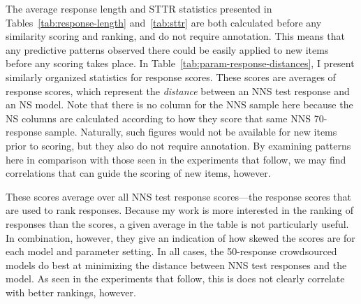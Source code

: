 The average response length and STTR statistics presented in Tables~\ref{tab:response-length} and~\ref{tab:sttr} are both calculated before any similarity scoring and ranking, and do not require annotation. This means that any predictive patterns observed there could be easily applied to new items before any scoring takes place. In Table~\ref{tab:param-response-distances}, I present similarly organized statistics for response scores. These scores are averages of response scores, which represent the \textit{distance} between an NNS test response and an NS model. Note that there is no column for the NNS sample here because the NS columns are calculated according to how they score that same NNS 70-response sample. Naturally, such figures would not be available for new items prior to scoring, but they also do not require annotation. By examining patterns here in comparison with those seen in the experiments that follow, we may find correlations that can guide the scoring of new items, however.

These scores average over all NNS test response scores---the response scores that are used to rank responses. Because my work is more interested in the ranking of responses than the scores, a given average in the table is not particularly useful. In combination, however, they give an indication of how skewed the scores are for each model and parameter setting. In all cases, the 50-response crowdsourced models do best at minimizing the distance between NNS test responses and the model. As seen in the experiments that follow, this is does not clearly correlate with better rankings, however.



